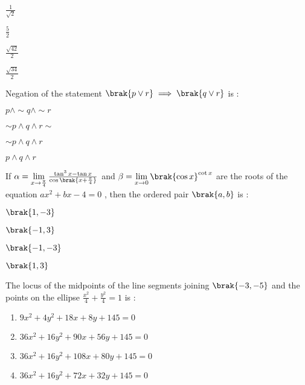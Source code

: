 \begin{enumerate}
\begin{multicols}{2}
\item $\frac{1}{\sqrt{2}}$
\item $\frac{5}{2}$
\end{multicols}
\begin{multicols}{2}
\item $\frac{\sqrt{42}}{2}$
\item $\frac{\sqrt{34}}{2}$
\end{multicols}
\end{enumerate}
\item %
Negation of the statement $\brak{p \vee r } \implies \brak{q \vee r }$ is :
\begin{enumerate}
\begin{multicols}{2}
\item $p \land \sim q \land \sim r$
\item $\sim p \land q \land r \sim$
\end{multicols}
\begin{multicols}{2}
\item $ \sim p \land q \land r$
\item $ p \land q \land r $
\end{multicols}
\end{enumerate}
\item %
If $\alpha = \lim\limits_{x \to \frac{\pi}{4}} \frac{\tan^3{x}-\tan{x}}{\cos{\brak{x+\frac{\pi}{4}}} }$ and $\beta = \lim\limits_{x \to 0} \brak{\cos{x}}^{\cot{x}}$ are the roots of the equation $ax^2+bx-4=0$ , then the ordered pair $\brak{a,b}$ is :
\begin{enumerate}
\begin{multicols}{2}
\item $\brak{1,-3}$
\item $\brak{-1,3}$
\end{multicols}
\begin{multicols}{2}
\item $\brak{-1,-3}$
\item $\brak{1,3}$
\end{multicols}
\end{enumerate}
\item %
The locus of the midpoints of the line segments joining $\brak{-3,-5}$ and the points on the ellipse $\frac{x^2}{4}+\frac{y^2}{4}=1$ is :
\begin{enumerate}
\item $9x^2 + 4y^2 + 18x + 8y + 145=0$
\item $36x^2 + 16y^2 +90x +56y +145=0$
\item $36x^2 + 16y^2 +108x +80y +145=0$
\item $36x^2 + 16y^2 +72x +32y +145=0$
\end{enumerate}
